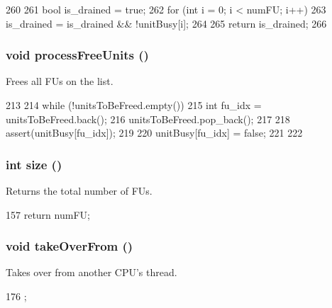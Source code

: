 \begin{DoxyCode}
260 {
261     bool is_drained = true;
262     for (int i = 0; i < numFU; i++)
263         is_drained = is_drained && !unitBusy[i];
264 
265     return is_drained;
266 }
\end{DoxyCode}
\hypertarget{classFUPool_a1bcdcf502cf9d45b221bd0ddfd98e1dc}{
\subsubsection[{processFreeUnits}]{\setlength{\rightskip}{0pt plus 5cm}void processFreeUnits ()}}
\label{classFUPool_a1bcdcf502cf9d45b221bd0ddfd98e1dc}
Frees all FUs on the list. 


\begin{DoxyCode}
213 {
214     while (!unitsToBeFreed.empty()) {
215         int fu_idx = unitsToBeFreed.back();
216         unitsToBeFreed.pop_back();
217 
218         assert(unitBusy[fu_idx]);
219 
220         unitBusy[fu_idx] = false;
221     }
222 }
\end{DoxyCode}
\hypertarget{classFUPool_af4b57d21919c42d55af03391f91a1c08}{
\subsubsection[{size}]{\setlength{\rightskip}{0pt plus 5cm}int size ()}}
\label{classFUPool_af4b57d21919c42d55af03391f91a1c08}
Returns the total number of FUs. 


\begin{DoxyCode}
157 { return numFU; }
\end{DoxyCode}
\hypertarget{classFUPool_a8674059ce345e23aac5086b2c3e24a43}{
\subsubsection[{takeOverFrom}]{\setlength{\rightskip}{0pt plus 5cm}void takeOverFrom ()}}
\label{classFUPool_a8674059ce345e23aac5086b2c3e24a43}
Takes over from another CPU's thread. 


\begin{DoxyCode}
176 {};
\end{DoxyCode}


